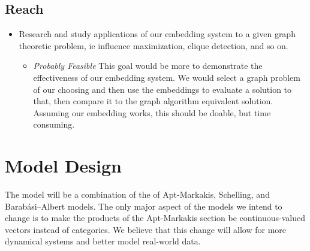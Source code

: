 \documentclass[10pt]{article}
\begin{document}
\subsection{Reach}
\begin{itemize}
\item Research and study applications of our embedding system to a given graph theoretic problem, ie influence maximization, clique detection, and so on. 
\begin{itemize}
\item \textit{Probably Feasible} This goal would be more to demonstrate the effectiveness of our embedding system. We would select a graph problem of our choosing and then use the embeddings to evaluate a solution to that, then compare it to the graph algorithm equivalent solution. Assuming our embedding works, this should be doable, but time consuming.
\end{itemize}
\end{itemize}

\pagebreak

\section{Model Design}

The model will be a combination of the of Apt-Markakis, Schelling, and Barabási–Albert models. The only major aspect of the models we intend to change is to make the products of the Apt-Markakis section be continuous-valued vectors instead of categories. We believe that this change will allow for more dynamical systems and better model real-world data. 
\end{document}
